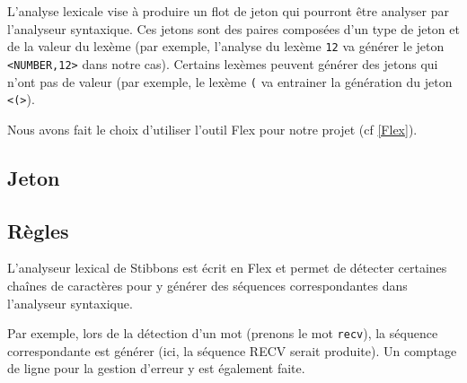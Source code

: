L'analyse lexicale vise à produire un flot de jeton qui pourront être analyser par l'analyseur syntaxique. Ces jetons sont des paires composées d'un type de jeton et de la valeur du lexème (par exemple, l'analyse du lexème \verb|12| va générer le jeton \verb|<NUMBER,12>| dans notre cas). Certains lexèmes peuvent générer des jetons qui n'ont pas de valeur (par exemple, le lexème \verb|(| va entrainer la génération du jeton \verb|<(>|).

Nous avons fait le choix d'utiliser l'outil Flex pour notre projet (cf \ref{Flex}).

\subsection{Jeton}


\subsection{Règles}


L'analyseur lexical de Stibbons est écrit en Flex et permet de détecter certaines chaînes de caractères pour y générer des séquences correspondantes dans l'analyseur syntaxique.

Par exemple, lors de la détection d'un mot (prenons le mot \verb|recv|), la séquence correspondante est générer (ici, la séquence RECV serait produite).
Un comptage de ligne pour la gestion d'erreur y est également faite.


